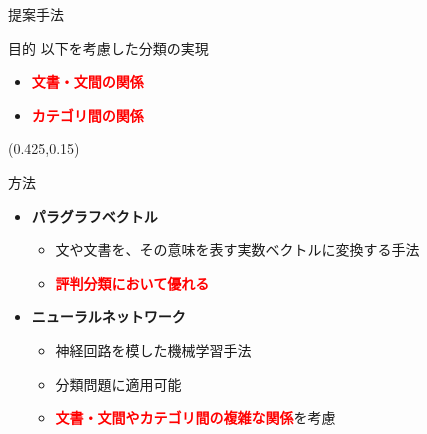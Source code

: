 \documentclass[aspectratio=43,unicode,10pt]{beamer}
\newcommand{\itemtitle}[1]{\textbf{#1}\\}
\newcommand{\fire}[1]{\textcolor{red}{\textbf{#1}}}
\begin{document}
\begin{frame}{提案手法}{}
  \begin{block}{目的}
    以下を考慮した分類の実現
    \begin{itemize}
      \item \fire{文書・文間の関係}
      \item \fire{カテゴリ間の関係}
    \end{itemize}
  \end{block}
  \begin{textblock}{0.6}(0.425,0.15)
    \fboxsep=2mm %
  \end{textblock}
  \begin{block}{方法}
    \begin{itemize}
      \item \itemtitle{パラグラフベクトル}
        \begin{itemize}
          \item 文や文書を、その意味を表す実数ベクトルに変換する手法
          \item \fire{評判分類において優れる}
        \end{itemize}
      \item \itemtitle{ニューラルネットワーク}
        \begin{itemize}
          \item 神経回路を模した機械学習手法
          \item 分類問題に適用可能
          \item \fire{文書・文間やカテゴリ間の複雑な関係}を考慮
        \end{itemize}
    \end{itemize}
  \end{block}
\end{frame}
\end{document}
